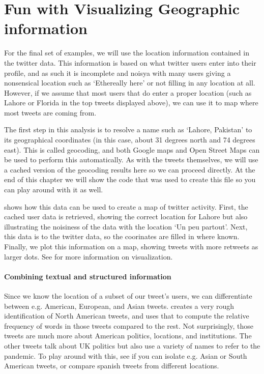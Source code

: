 
\section{Fun with Visualizing Geographic information}
For the final set of examples, we will use the location information contained in the twitter data.
This information is based on what twitter users enter into their profile, and as such it is incomplete and noisya
with many users giving a nonsensical location such as `Ethereally here' or not filling in any location at all.
However, if we assume that most users that do enter a proper location (such as Lahore or Florida in the top tweets displayed above),
we can use it to map where most tweets are coming from.

The first step in this analysis is to resolve a name such as `Lahore, Pakistan' to its geographical coordinates (in this case, about 31 degrees north and 74 degrees east). This is called geocoding, and both Google maps and Open Street Maps can be used
to perform this automatically.
As with the tweets themselves, we will use a cached version of the geocoding results here so we can proceed directly.
At the end of this chapter we will show the code that was used to create this file so you can play around with it as well. 

 shows how this data can be used to create a map of twitter activity.
First, the cached user data is retrieved, showing the correct location for Lahore but also
illustrating the noisiness of the data with the location `Un peu partout'.
Next, this data is  to the twitter data, so the coorinates are filled in where known.
Finally, we plot this information on a map, showing tweets with more retweets as larger dots.
See  for more information on visualization.



\paragraph{Combining textual and structured information}
Since we know the location of a subset of our tweet's users,
we can differentiate between e.g. American, European, and Asian tweets.
 creates a very rough identification of North American tweets,
and uses that to compute the relative frequency of words in those tweets compared to the rest.
Not surprisingly, those tweets are much more about American politics, locations, and institutions.
The other tweets talk about UK politics but also use a variety of names to refer to the pandemic.
To play around with this, see if you can isolate e.g. Asian or South American tweets,
or compare spanish tweets from different locations.

